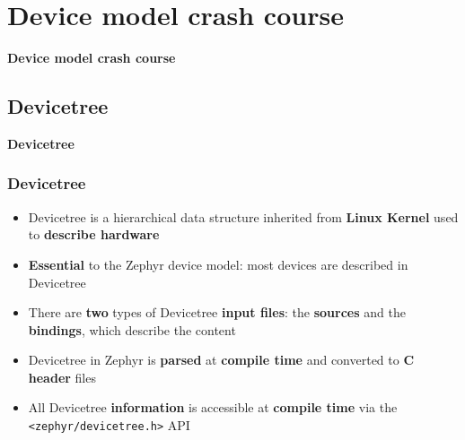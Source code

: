 \documentclass[handout]{beamer}
\begin{document}
\section{Device model crash course}

\begin{frame}
  \begin{center}
    \Huge \textbf{Device model crash course}
  \end{center}
\end{frame}

\subsection{Devicetree}

\begin{frame}
  \begin{center}
    \Large \textbf{Devicetree}
  \end{center}
\end{frame}

\begin{frame}
  \frametitle{Devicetree}

  \begin{itemize}
    \item Devicetree is a hierarchical data structure inherited from
          \textbf{Linux Kernel} used to \textbf{describe hardware}
    \item \textbf{Essential} to the Zephyr device model: most devices are
          described in Devicetree
    \item There are \textbf{two} types of Devicetree \textbf{input files}:
          the \textbf{sources} and the \textbf{bindings}, which describe the
          content
    \item Devicetree in Zephyr is \textbf{parsed} at \textbf{compile time} and
          converted to \textbf{C header} files
    \item All Devicetree \textbf{information} is accessible at
          \textbf{compile time} via the \texttt{<zephyr/devicetree.h>} API
  \end{itemize}
\end{frame}
\end{document}
